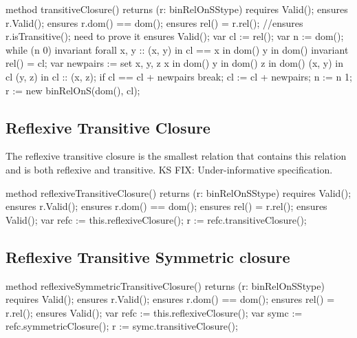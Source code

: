 \documentclass[letterpaper,10pt,english]{sphinxmanual}
\begin{document}
\begin{sphinxVerbatim}[commandchars=\\\{\}]
method transitiveClosure() returns (r: binRelOnS\PYGZlt{}Stype\PYGZgt{})
    requires Valid();
    ensures r.Valid();
    ensures r.dom() == dom();
    ensures rel() \PYGZlt{}= r.rel();
    //ensures r.isTransitive(); \PYGZhy{}\PYGZhy{} need to prove it
    ensures Valid();
\PYGZob{}
    var cl := rel();
    var n := \textbar{}dom()\textbar{};
    while (n \PYGZgt{} 0)
        invariant forall x, y ::
            (x, y) in cl ==\PYGZgt{} x in dom() \PYGZam{}\PYGZam{} y in dom()
        invariant rel() \PYGZlt{}= cl;
    \PYGZob{}
        var new\PYGZus{}pairs := set x, y, z \textbar{}
                x in dom() \PYGZam{}\PYGZam{} y in dom() \PYGZam{}\PYGZam{} z in dom() \PYGZam{}\PYGZam{}
                (x, y) in cl \PYGZam{}\PYGZam{} (y, z) in cl ::
                (x, z);
        if cl == cl + new\PYGZus{}pairs \PYGZob{} break; \PYGZcb{}
        cl := cl + new\PYGZus{}pairs;
        n := n \PYGZhy{} 1;
    \PYGZcb{}
    r := new binRelOnS(dom(), cl);
\PYGZcb{}
\end{sphinxVerbatim}


\subsection{Reflexive Transitive Closure}
\label{\detokenize{08-relations:reflexive-transitive-closure}}
The reflexive transitive closure is the smallest relation that
contains this relation and is both reflexive and transitive.  KS FIX:
Under-informative specification.

\begin{sphinxVerbatim}[commandchars=\\\{\}]
method reflexiveTransitiveClosure() returns (r: binRelOnS\PYGZlt{}Stype\PYGZgt{})
    requires Valid();
    ensures r.Valid();
    ensures r.dom() == dom();
    ensures rel() \PYGZlt{}= r.rel();
    ensures Valid();
\PYGZob{}
    var refc := this.reflexiveClosure();
    r := refc.transitiveClosure();
\PYGZcb{}
\end{sphinxVerbatim}


\subsection{Reflexive Transitive Symmetric closure}
\label{\detokenize{08-relations:reflexive-transitive-symmetric-closure}}
\begin{sphinxVerbatim}[commandchars=\\\{\}]
method reflexiveSymmetricTransitiveClosure()
    returns (r: binRelOnS\PYGZlt{}Stype\PYGZgt{})
    requires Valid();
    ensures r.Valid();
    ensures r.dom() == dom();
    ensures rel() \PYGZlt{}= r.rel();
    ensures Valid();
\PYGZob{}
    var refc := this.reflexiveClosure();
    var symc := refc.symmetricClosure();
    r := symc.transitiveClosure();
\PYGZcb{}
\end{sphinxVerbatim}
\end{document}

